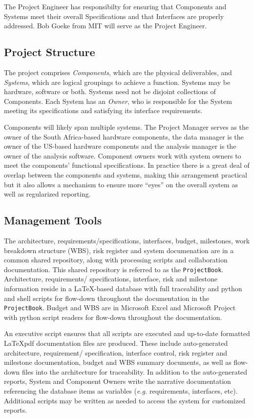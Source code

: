 \documentclass[preprint]{aastex}
\begin{document}
The Project Engineer has responsibilty for ensuring that Components and Systems meet their overall
Specifications and that Interfaces are properly addressed.  Bob Goeke from MIT will serve as the
Project Engineer.

\subsection{Project Structure}
The project comprises {\em Components}, which are the physical deliverables, and {\em Systems},
which are logical groupings to achieve a function. Systems may be hardware, software
or both. Systems need not be disjoint collections of Components. Each System has an
{\em Owner}, who is responsible for the System meeting its specifications and satisfying
its interface requirements.

Components will likely span multiple systems. The Project Manager serves as the owner
of the South Africa-based hardware components, the data manager is the owner of the
US-based hardware components and the analysis manager is the owner of the analysis
software. Component owners work with system owners to meet the components' functional
specifications. In practice there is a great deal of overlap between the components
and systems, making this arrangement practical but it also allows a mechanism to
ensure more ``eyes'' on the overall system as well as regularized reporting.

\subsection{Management Tools}
The architecture, requirements/specifications, interfaces, budget, milestones, work
breakdown structure (WBS), risk register and system documenation are in a common
shared repository, along with processing scripts and collaboration documentation.
This shared repository is referred to as the {\tt ProjectBook}. Architecture,
requirements/ specifications, interface, risk and milestone information reside in a
\LaTeX-based database with full traceability and python and shell scripts for
flow-down throughout the documentation in the {\tt ProjectBook}. Budget and WBS are
in Microsoft Excel and Microsoft Project with python script readers for flow-down
throughout the documentation.

An executive script ensures that all scripts are executed and up-to-date formatted \LaTeX pdf documentation
files are produced.  These include auto-generated architecture, requirement/ specification, 
interface control, risk register and milestone documentation, budget and WBS summary documents, as well as
flow-down files into the architecture for traceability. 
In addition to the auto-generated reports, System and  Component Owners write the narrative 
documentation referencing the database items as variables ({\em e.g.} requirements, interfaces, etc).
Additional scripts may be written as needed to access the system for customized reports.
\end{document}
